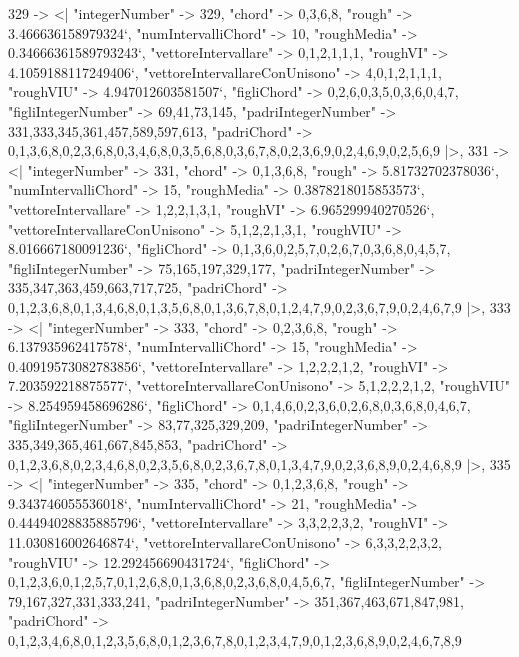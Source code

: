 \documentclass[
]{article}
\begin{document}
\begin{DatasetVerbatim}
  329 -> <|
    "integerNumber" -> 329,
    "chord" -> {0,3,6,8},
    "rough" -> 3.466636158979324`,
    "numIntervalliChord" -> 10,
    "roughMedia" -> 0.34666361589793243`,
    "vettoreIntervallare" -> {0,1,2,1,1,1},
    "roughVI" -> 4.1059188117249406`,
    "vettoreIntervallareConUnisono" -> {4,0,1,2,1,1,1},
    "roughVIU" -> 4.947012603581507`,
    "figliChord" -> {{0,2,6},{0,3,5},{0,3,6},{0,4,7}},
    "figliIntegerNumber" -> {69,41,73,145},
    "padriIntegerNumber" -> {331,333,345,361,457,589,597,613},
    "padriChord" -> {{0,1,3,6,8},{0,2,3,6,8},{0,3,4,6,8},{0,3,5,6,8},{0,3,6,7,8},{0,2,3,6,9},{0,2,4,6,9},{0,2,5,6,9}}
  |>,
  331 -> <|
    "integerNumber" -> 331,
    "chord" -> {0,1,3,6,8},
    "rough" -> 5.81732702378036`,
    "numIntervalliChord" -> 15,
    "roughMedia" -> 0.3878218015853573`,
    "vettoreIntervallare" -> {1,2,2,1,3,1},
    "roughVI" -> 6.965299940270526`,
    "vettoreIntervallareConUnisono" -> {5,1,2,2,1,3,1},
    "roughVIU" -> 8.016667180091236`,
    "figliChord" -> {{0,1,3,6},{0,2,5,7},{0,2,6,7},{0,3,6,8},{0,4,5,7}},
    "figliIntegerNumber" -> {75,165,197,329,177},
    "padriIntegerNumber" -> {335,347,363,459,663,717,725},
    "padriChord" -> {{0,1,2,3,6,8},{0,1,3,4,6,8},{0,1,3,5,6,8},{0,1,3,6,7,8},{0,1,2,4,7,9},{0,2,3,6,7,9},{0,2,4,6,7,9}}
  |>,
  333 -> <|
    "integerNumber" -> 333,
    "chord" -> {0,2,3,6,8},
    "rough" -> 6.137935962417578`,
    "numIntervalliChord" -> 15,
    "roughMedia" -> 0.40919573082783856`,
    "vettoreIntervallare" -> {1,2,2,2,1,2},
    "roughVI" -> 7.203592218875577`,
    "vettoreIntervallareConUnisono" -> {5,1,2,2,2,1,2},
    "roughVIU" -> 8.254959458696286`,
    "figliChord" -> {{0,1,4,6},{0,2,3,6},{0,2,6,8},{0,3,6,8},{0,4,6,7}},
    "figliIntegerNumber" -> {83,77,325,329,209},
    "padriIntegerNumber" -> {335,349,365,461,667,845,853},
    "padriChord" -> {{0,1,2,3,6,8},{0,2,3,4,6,8},{0,2,3,5,6,8},{0,2,3,6,7,8},{0,1,3,4,7,9},{0,2,3,6,8,9},{0,2,4,6,8,9}}
  |>,
  335 -> <|
    "integerNumber" -> 335,
    "chord" -> {0,1,2,3,6,8},
    "rough" -> 9.343746055536018`,
    "numIntervalliChord" -> 21,
    "roughMedia" -> 0.44494028835885796`,
    "vettoreIntervallare" -> {3,3,2,2,3,2},
    "roughVI" -> 11.030816002646874`,
    "vettoreIntervallareConUnisono" -> {6,3,3,2,2,3,2},
    "roughVIU" -> 12.292456690431724`,
    "figliChord" -> {{0,1,2,3,6},{0,1,2,5,7},{0,1,2,6,8},{0,1,3,6,8},{0,2,3,6,8},{0,4,5,6,7}},
    "figliIntegerNumber" -> {79,167,327,331,333,241},
    "padriIntegerNumber" -> {351,367,463,671,847,981},
    "padriChord" -> {{0,1,2,3,4,6,8},{0,1,2,3,5,6,8},{0,1,2,3,6,7,8},{0,1,2,3,4,7,9},{0,1,2,3,6,8,9},{0,2,4,6,7,8,9}}

\end{DatasetVerbatim}
\end{document}
